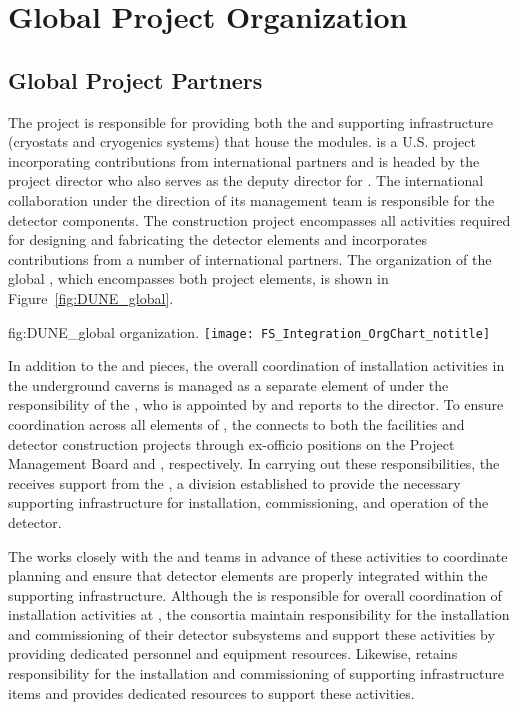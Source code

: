 \chapter{Global Project Organization}
\label{vl:tc-global}

\section{Global Project Partners}
\label{sec:partners}

The  project is responsible for providing both the
 and supporting infrastructure (cryostats and
cryogenics systems) that house the  
modules.  is a U.S.  project incorporating
contributions from international partners and is headed by the
 project director who also serves as the 
deputy director for .  
The international 
collaboration under the direction of its management team is
responsible for the detector components.  The  
construction project encompasses all activities required for designing
and fabricating the detector elements and incorporates contributions
from a number of international partners.  The organization of the
global , which encompasses both project elements, is
shown in Figure~\ref{fig:DUNE_global}.
\begin{dunefigure}{fig:DUNE_global}
  { organization.}
  \texttt{[image: FS\_Integration\_OrgChart\_notitle]}
\end{dunefigure}

In addition to the  and  pieces, the overall
coordination of installation activities in the underground caverns 
is managed as a separate element of  under the
responsibility of the , who is appointed by and reports
to the  director.  To ensure coordination across
all elements of , the  connects to both
the facilities and detector construction projects through ex-officio
positions on the  Project Management Board and
 , respectively.  In carrying out these
responsibilities, the  receives support from the ,
a  division established to 
provide the necessary supporting infrastructure for installation, commissioning, and operation 
of the  detector.

The  works closely with the  and 
teams in advance of these activities to coordinate planning
and ensure that detector elements are properly integrated within the 
supporting infrastructure.  Although the  is responsible 
for overall coordination of  installation activities
at , the  consortia maintain responsibility 
for the installation and commissioning of their detector subsystems
and support these activities by providing dedicated personnel and
equipment resources.  Likewise,  retains responsibility
for the installation and commissioning of supporting infrastructure
items and provides dedicated resources to support these activities.          

